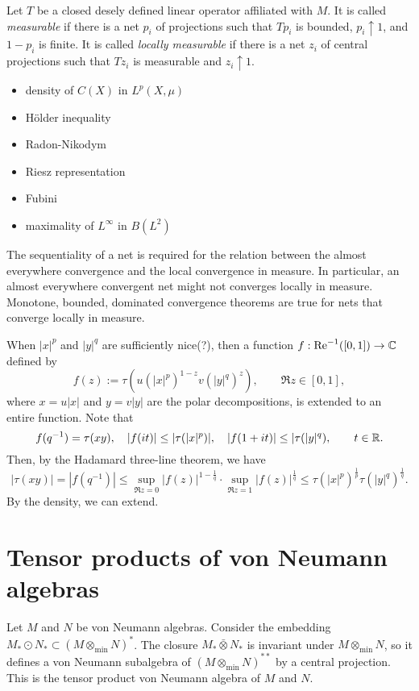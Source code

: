 \documentclass{../../large}
\begin{document}
Let $T$ be a closed desely defined linear operator affiliated with $M$.
It is called \emph{measurable} if there is a net $p_i$ of projections such that $Tp_i$ is bounded, $p_i\uparrow1$, and $1-p_i$ is finite.
It is called \emph{locally measurable} if there is a net $z_i$ of central projections such that $Tz_i$ is measurable and $z_i\uparrow1$.

\begin{itemize}
\item density of $C(X)$ in $L^p(X,\mu)$
\item H\"older inequality
\item Radon-Nikodym
\item Riesz representation
\item Fubini
\item maximality of $L^\infty$ in $B(L^2)$
\end{itemize}




The sequentiality of a net is required for the relation between the almost everywhere convergence and the local convergence in measure.
In particular, an almost everywhere convergent net might not converges locally in measure.
Monotone, bounded, dominated convergence theorems are true for nets that converge locally in measure.

When $|x|^p$ and $|y|^q$ are sufficiently nice(?), then a function $f:\operatorname{Re}^{-1}([0,1])\to\mathbb{C}$ defined by
\[f(z):=\tau(u(|x|^p)^{1-z}v(|y|^q)^z),\qquad\Re z\in[0,1],\]
where $x=u|x|$ and $y=v|y|$ are the polar decompositions, is extended to an entire function.
Note that
\[f(q^{-1})=\tau(xy),\quad|f(it)|\le|\tau(|x|^p)|,\quad|f(1+it)|\le|\tau(|y|^q),\qquad t\in\mathbb{R}.\]
Then, by the Hadamard three-line theorem, we have
\[|\tau(xy)|=|f(q^{-1})|\le\sup_{\Re z=0}|f(z)|^{1-\frac1q}\cdot\sup_{\Re z=1}|f(z)|^{\frac1q}\le\tau(|x|^p)^{\frac1p}\tau(|y|^q)^{\frac1q}.\]
By the density, we can extend.

\section{Tensor products of von Neumann algebras}


\begin{prb}
Let $M$ and $N$ be von Neumann algebras.
Consider the embedding $M_*\odot N_*\subset(M\otimes_{\min}N)^*$.
The closure $M_*\bar\otimes N_*$ is invariant under $M\otimes_{\min}N$, so it defines a von Neumann subalgebra of $(M\otimes_{\min}N)^{**}$ by a central projection.
This is the tensor product von Neumann algebra of $M$ and $N$.
\end{prb}
\end{document}
